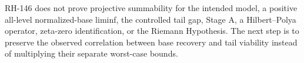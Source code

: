 \documentclass[12pt]{article}
\begin{document}
RH-146 does not prove projective summability for the intended model, a
positive all-level normalized-base liminf, the controlled tail gap, Stage A,
a Hilbert--Polya operator, zeta-zero identification, or the Riemann
Hypothesis.  The next step is to preserve the observed correlation between
base recovery and tail viability instead of multiplying their separate
worst-case bounds.



\end{document}
